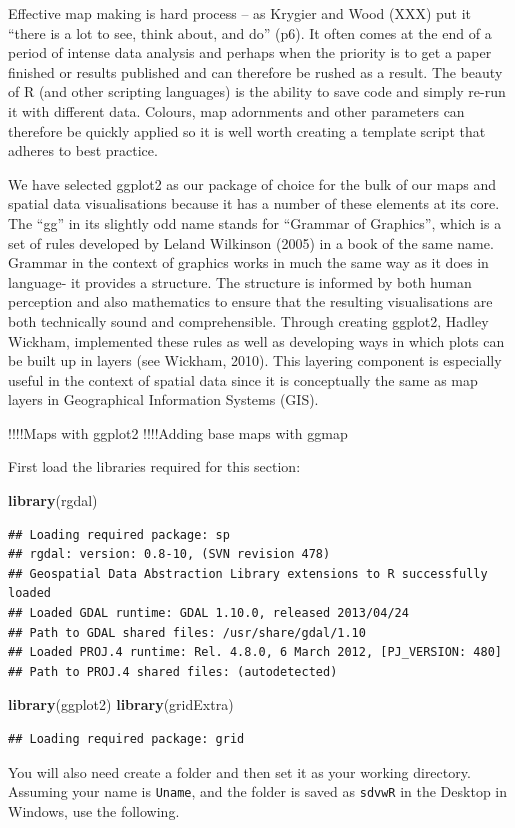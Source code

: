 \documentclass[]{article}
\newenvironment{Shaded}{}{}
\newcommand{\KeywordTok}[1]{\textcolor[rgb]{0.00,0.44,0.13}{\textbf{{#1}}}}
\newcommand{\NormalTok}[1]{{#1}}
\begin{document}
Effective map making is hard process -- as Krygier and Wood (XXX) put it
``there is a lot to see, think about, and do'' (p6). It often comes at
the end of a period of intense data analysis and perhaps when the
priority is to get a paper finished or results published and can
therefore be rushed as a result. The beauty of R (and other scripting
languages) is the ability to save code and simply re-run it with
different data. Colours, map adornments and other parameters can
therefore be quickly applied so it is well worth creating a template
script that adheres to best practice.

We have selected ggplot2 as our package of choice for the bulk of our
maps and spatial data visualisations because it has a number of these
elements at its core. The ``gg'' in its slightly odd name stands for
``Grammar of Graphics'', which is a set of rules developed by Leland
Wilkinson (2005) in a book of the same name. Grammar in the context of
graphics works in much the same way as it does in language- it provides
a structure. The structure is informed by both human perception and also
mathematics to ensure that the resulting visualisations are both
technically sound and comprehensible. Through creating ggplot2, Hadley
Wickham, implemented these rules as well as developing ways in which
plots can be built up in layers (see Wickham, 2010). This layering
component is especially useful in the context of spatial data since it
is conceptually the same as map layers in Geographical Information
Systems (GIS).

!!!!Maps with ggplot2 !!!!Adding base maps with ggmap

First load the libraries required for this section:

\begin{Shaded}
\begin{Highlighting}[]
\KeywordTok{library}\NormalTok{(rgdal)}
\end{Highlighting}
\end{Shaded}
\begin{verbatim}
## Loading required package: sp
## rgdal: version: 0.8-10, (SVN revision 478)
## Geospatial Data Abstraction Library extensions to R successfully loaded
## Loaded GDAL runtime: GDAL 1.10.0, released 2013/04/24
## Path to GDAL shared files: /usr/share/gdal/1.10
## Loaded PROJ.4 runtime: Rel. 4.8.0, 6 March 2012, [PJ_VERSION: 480]
## Path to PROJ.4 shared files: (autodetected)
\end{verbatim}
\begin{Shaded}
\begin{Highlighting}[]
\KeywordTok{library}\NormalTok{(ggplot2)}
\KeywordTok{library}\NormalTok{(gridExtra)}
\end{Highlighting}
\end{Shaded}
\begin{verbatim}
## Loading required package: grid
\end{verbatim}
You will also need create a folder and then set it as your working
directory. Assuming your name is \texttt{Uname}, and the folder is saved
as \texttt{sdvwR} in the Desktop in Windows, use the following.
\end{document}
